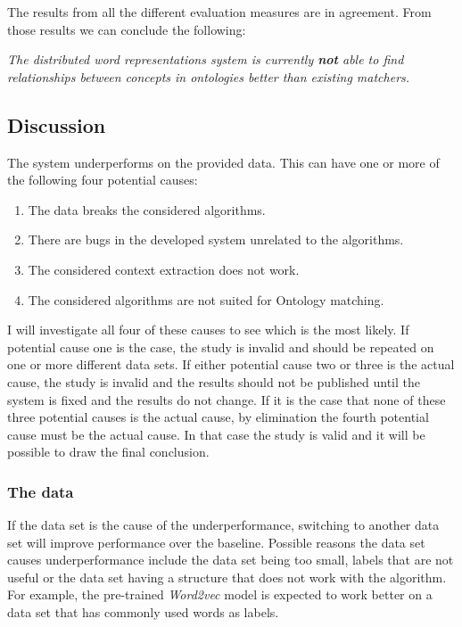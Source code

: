 \documentclass{article}
\begin{document}
The results from all the different evaluation measures are in agreement. From those results we can conclude the following:

 \begin{center}
 \textit{
 The distributed word representations system is currently \textbf{not} able to find relationships between concepts in ontologies better than existing matchers.
 }
 \end{center}

 
 
 
 
 
 
 \subsection{Discussion}
  The system underperforms on the provided data. This can have one or more of the following four potential causes:
  \begin{enumerate}
  \item The data breaks the considered algorithms.
  \item There are bugs in the developed system unrelated to the algorithms.
  \item The considered context extraction does not work.
  \item The considered algorithms are not suited for Ontology matching.
  \end{enumerate}
  
  I will investigate all four of these causes to see which is the most likely. If potential cause one is the case, the study is invalid and should be repeated on one or more different data sets. If either potential cause two or three is the actual cause, the study is invalid and the results should not be published until the system is fixed and the results do not change. If it is the case that none of these three potential causes is the actual cause, by elimination the fourth potential cause must be the actual cause. In that case the study is valid and it will be possible to draw the final conclusion.
  
  \subsubsection{The data}
  If the data set is the cause of the underperformance, switching to another data set will improve performance over the baseline. Possible reasons the data set causes underperformance include the data set being too small, labels that are not useful or the data set having a structure that does not work with the algorithm. For example, the pre-trained \emph{Word2vec} model is expected to work better on a data set that has commonly used words as labels. %
\end{document}

